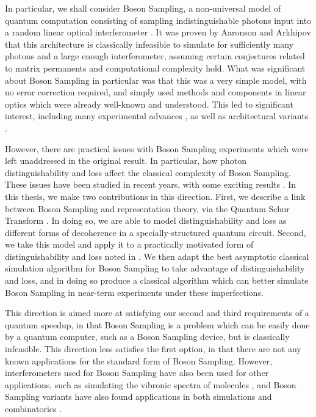 In particular, we shall consider Boson Sampling, a non-universal model of quantum computation consisting of sampling indistinguishable photons input into a random linear optical interferometer \cite{aaronson2010report, aaronson2011}. It was proven by Aaronson and Arkhipov that this architecture is classically infeasible to simulate for sufficiently many photons and a large enough interferometer, assuming certain conjectures related to matrix permanents and computational complexity hold. What was significant about Boson Sampling in particular was that this was a very simple model, with no error correction required, and simply used methods and components in linear optics which were already well-known and understood. This led to significant interest, including many experimental advances \cite{broome2013, spring2013, tillmann2013, crespi2013, carolan2015, wang2017, paesani2018, wang2019}, as well as architectural variants \cite{aaronson2013, lund2014, hamilton2017}.

However, there are practical issues with Boson Sampling experiments which were left unaddressed in the original result. In particular, how photon distinguishability and loss affect the classical complexity of Boson Sampling. These issues have been studied in recent years, with some exciting results \cite{garciapatron2017, renema2018, renema2018loss, oszmaniec2018, brod2019}. In this thesis, we make two contributions in this direction. First, we describe a link between Boson Sampling and representation theory, via the Quantum Schur Transform \cite{bacon2004, harrow2005, bacon2007}. In doing so, we are able to model distinguishability and loss as different forms of decoherence in a specially-structured quantum circuit. Second, we take this model and apply it to a practically motivated form of distinguishability and loss noted in \cite{renema2018, renema2018loss}. We then adapt the best asymptotic classical simulation algorithm for Boson Sampling \cite{clifford2017} to take advantage of distinguishability and loss, and in doing so produce a classical algorithm which can better simulate Boson Sampling in near-term experiments under these imperfections.

This direction is aimed more at satisfying our second and third requirements of a quantum speedup, in that Boson Sampling is a problem which can be easily done by a quantum computer, such as a Boson Sampling device, but is classically infeasible. This direction less satisfies the first option, in that there are not any known applications for the standard form of Boson Sampling. However, interferometers used for Boson Sampling have also been used for other applications, such as simulating the vibronic spectra of molecules \cite{sparrow2018}, and Boson Sampling variants have also found applications in both simulations and combinatorics \cite{huh2015, bradler2018, schuld2019}.

